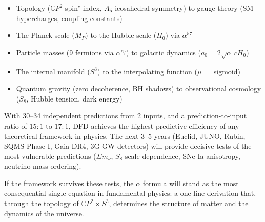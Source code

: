 \documentclass[12pt,a4paper]{article}
\newcommand{\CP}{\mathbb{C}P}
\begin{document}
\begin{itemize}[nosep]
\item Topology ($\CP^2$ spin$^c$ index, $A_5$ icosahedral symmetry)
  to gauge theory (SM hypercharges, coupling constants)
\item The Planck scale ($M_P$) to the Hubble scale ($H_0$) via $\alpha^{57}$
\item Particle masses (9 fermions via $\alpha^{n_f}$) to galactic dynamics
  ($a_0 = 2\sqrt{\alpha}\,cH_0$)
\item The internal manifold ($S^3$) to the interpolating function
  ($\mu = $ sigmoid)
\item Quantum gravity (zero decoherence, BH shadows) to observational
  cosmology ($S_8$, Hubble tension, dark energy)
\end{itemize}

\noindent
With 30--34 independent predictions from 2 inputs, and a prediction-to-input
ratio of $15{:}1$ to $17{:}1$, DFD achieves the highest predictive
efficiency of any theoretical framework in physics.  The next 3--5 years
(Euclid, JUNO, Rubin, SQMS Phase I, Gaia DR4, 3G GW detectors) will
provide decisive tests of the most vulnerable predictions ($\Sigma m_\nu$,
$S_8$ scale dependence, SNe Ia anisotropy, neutrino mass ordering).

If the framework survives these tests, the $\alpha$ formula will stand as
the most consequential single equation in fundamental physics: a one-line
derivation that, through the topology of $\CP^2 \times S^3$, determines
the structure of matter and the dynamics of the universe.
\end{document}
